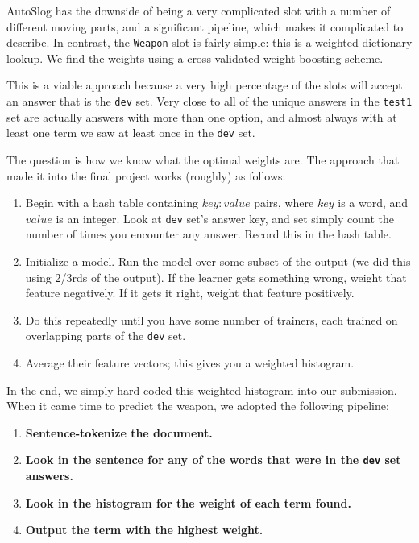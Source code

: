 \documentclass[11pt]{myclass}
\begin{document}
AutoSlog has the downside of being a very complicated slot with a number of different moving parts, and a significant pipeline, which makes it complicated to describe. In contrast, the \texttt{Weapon} slot is fairly simple: this is a weighted dictionary lookup. We find the weights using a cross-validated weight boosting scheme.

This is a viable approach because a very high percentage of the slots will accept an answer that is the \texttt{dev} set. Very close to all of the unique answers in the \texttt{test1} set are actually answers with more than one option, and almost always with at least one term we saw at least once in the \texttt{dev} set.

The question is how we know what the optimal weights are. The approach that made it into the final project works (roughly) as follows:

\begin{enumerate}
\item Begin with a hash table containing $key : value$ pairs, where $key$ is a word, and $value$ is an integer. Look at \texttt{dev} set's answer key, and set simply count the number of times you encounter any answer. Record this in the hash table.

\item Initialize a model. Run the model over some subset of the output (we did this using 2/3rds of the output). If the learner gets something wrong, weight that feature negatively. If it gets it right, weight that feature positively.

\item Do this repeatedly until you have some number of trainers, each trained on overlapping parts of the \texttt{dev} set.

\item Average their feature vectors; this gives you a weighted histogram.
\end{enumerate}

In the end, we simply hard-coded this weighted histogram into our submission. When it came time to predict the weapon, we adopted the following pipeline:

\begin{enumerate}
\item \textbf{Sentence-tokenize the document.}

\item \textbf{Look in the sentence for any of the words that were in the \texttt{dev} set answers.}

\item \textbf{Look in the histogram for the weight of each term found.}

\item \textbf{Output the term with the highest weight.}
\end{enumerate}
\end{document}
